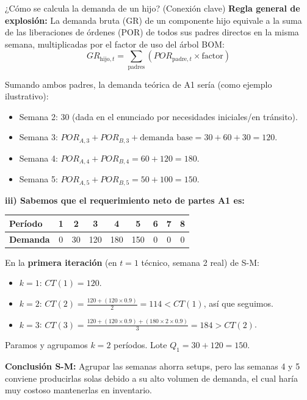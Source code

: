\begin{tipprueba}{¿Cómo se calcula la demanda de un hijo? (Conexión clave)}
   \textbf{Regla general de explosión:} La demanda bruta (GR) de un componente hijo equivale a la suma de las liberaciones de órdenes (POR) de todos sus padres directos en la misma semana, multiplicadas por el factor de uso del árbol BOM:
   $$GR_{\text{hijo},t} = \sum_{\text{padres}} (POR_{\text{padre},t} \times \text{factor})$$
   
   Sumando ambos padres, la demanda teórica de A1 sería (como ejemplo ilustrativo):
   \begin{itemize}
     \item Semana 2: 30 (dada en el enunciado por necesidades iniciales/en tránsito).
     \item Semana 3: $POR_{A,3} + POR_{B,3} + \text{demanda base} = 30 + 60 + 30 = 120$.
     \item Semana 4: $POR_{A,4} + POR_{B,4} = 60 + 120 = 180$.
     \item Semana 5: $POR_{A,5} + POR_{B,5} = 50 + 100 = 150$.
   \end{itemize}

   \textbf{iii) Sabemos que el requerimiento neto de partes A1 es:}
   \begin{center}
   \begin{tabular}{lcccccccc}
     \toprule
     \textbf{Período} & \textbf{1} & \textbf{2} & \textbf{3} & \textbf{4} & \textbf{5} & \textbf{6} & \textbf{7} & \textbf{8} \\
     \midrule
     \textbf{Demanda} & 0 & 30 & 120 & 180 & 150 & 0 & 0 & 0 \\
     \bottomrule
   \end{tabular}
   \end{center}

   En la \textbf{primera iteración} (en $t = 1$ técnico, semana 2 real) de S-M:
   \begin{itemize}
     \item $k = 1$: $CT(1) = 120$.
     \item $k = 2$: $CT(2) = \frac{120 + (120 \times 0.9)}{2} = 114 < CT(1)$, así que seguimos.
     \item $k = 3$: $CT(3) = \frac{120 + (120 \times 0.9) + (180 \times 2 \times 0.9)}{3} = 184 > CT(2)$.
   \end{itemize}
   Paramos y agrupamos $k=2$ períodos. Lote $Q_1 = 30 + 120 = 150$.

   \textbf{Conclusión S-M:} Agrupar las semanas ahorra setups, pero las semanas 4 y 5 conviene producirlas solas debido a su alto volumen de demanda, el cual haría muy costoso mantenerlas en inventario.
\end{tipprueba}
